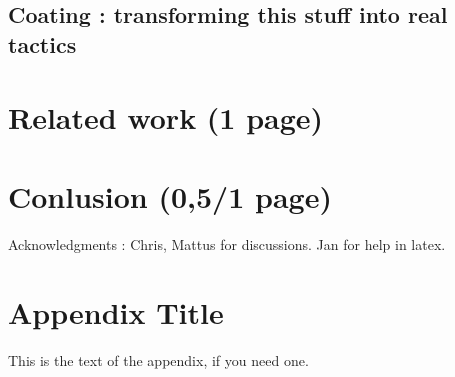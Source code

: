 \documentclass{sigplanconf}
\begin{document}
	\subsection {Coating : transforming this stuff into real tactics}

\section {Related work (1 page)}

\section {Conlusion (0,5/1 page)}


\acks

Acknowledgments : Chris, Mattus for discussions. Jan for help in latex.





\appendix
\section{Appendix Title}

This is the text of the appendix, if you need one.
\end{document}

